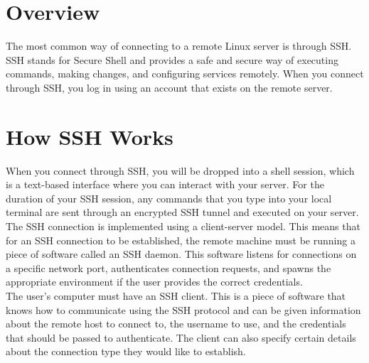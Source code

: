 \documentclass[12pt]{report}
\begin{document}
\setcounter{section}{0} 

\begin{screen}
\ppttitle
\end{screen}
\footskip 0.7cm
\thispagestyle{empty} 
\pagetitle
\newpage
{}
\cfoot{\thepage}

\tableofcontents

\cfoot{\thepage}

\newpage
\section{Overview}
The most common way of connecting to a remote Linux server is through SSH.
SSH stands for Secure Shell and provides a safe and secure way of executing
commands, making changes, and configuring services remotely. When you
connect through SSH, you log in using an account that exists on the remote
server.

\section{How SSH Works}
When you connect through SSH, you will be dropped into a shell session, which
is a text-based interface where you can interact with your server. For the
duration of your SSH session, any commands that you type into your local
terminal are sent through an encrypted SSH tunnel and executed on your
server.\\
The SSH connection is implemented using a client-server model. This means
that for an SSH connection to be established, the remote machine must be
running a piece of software called an SSH daemon. This software listens for
connections on a specific network port, authenticates connection requests, and
spawns the appropriate environment if the user provides the correct
credentials.\\
The user's computer must have an SSH client. This is a piece of software that
knows how to communicate using the SSH protocol and can be given
information about the remote host to connect to, the username to use, and the
credentials that should be passed to authenticate. The client can also specify
certain details about the connection type they would like to establish.
\end{document}
